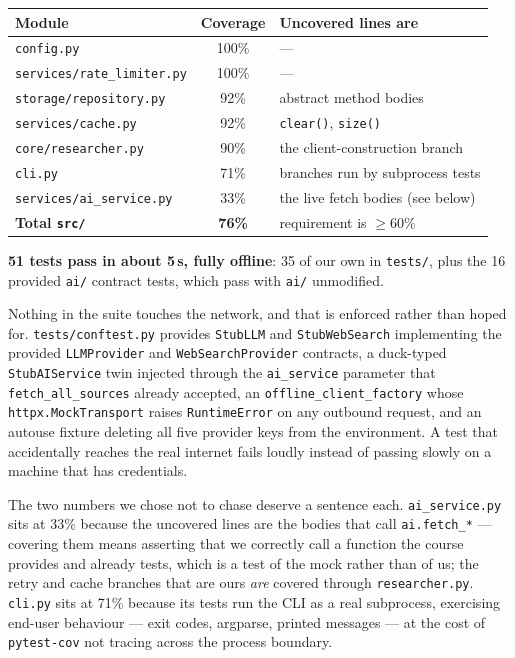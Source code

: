 \documentclass[11pt,a4paper]{article}
\begin{document}
\begin{center}\small
\begin{tabular}{lcl}
\toprule
\textbf{Module} & \textbf{Coverage} & \textbf{Uncovered lines are} \\
\midrule
\texttt{config.py}                & 100\% & --- \\
\texttt{services/rate\_limiter.py} & 100\% & --- \\
\texttt{storage/repository.py}    & 92\%  & abstract method bodies \\
\texttt{services/cache.py}        & 92\%  & \texttt{clear()}, \texttt{size()} \\
\texttt{core/researcher.py}       & 90\%  & the client-construction branch \\
\texttt{cli.py}                   & 71\%  & branches run by subprocess tests \\
\texttt{services/ai\_service.py}  & 33\%  & the live fetch bodies (see below) \\
\midrule
\textbf{Total \texttt{src/}}      & \textbf{76\%} & requirement is $\ge 60\%$ \\
\bottomrule
\end{tabular}
\end{center}

\vspace{-0.3em}
\noindent\textbf{51 tests pass in about 5\,s, fully offline}: 35 of our own in \texttt{tests/}, plus
the 16 provided \texttt{ai/} contract tests, which pass with \texttt{ai/} unmodified.

Nothing in the suite touches the network, and that is enforced rather than hoped for.
\texttt{tests/conftest.py} provides \texttt{StubLLM} and \texttt{StubWebSearch} implementing the
provided \texttt{LLMProvider} and \texttt{WebSearchProvider} contracts, a duck-typed
\texttt{StubAIService} twin injected through the \texttt{ai\_service} parameter that
\texttt{fetch\_all\_sources} already accepted, an \texttt{offline\_client\_factory} whose
\texttt{httpx.MockTransport} raises \texttt{RuntimeError} on any outbound request, and an autouse
fixture deleting all five provider keys from the environment. A test that accidentally reaches
the real internet fails loudly instead of passing slowly on a machine that has credentials.

The two numbers we chose not to chase deserve a sentence each. \texttt{ai\_service.py} sits at
33\% because the uncovered lines are the bodies that call \texttt{ai.fetch\_*} --- covering them
means asserting that we correctly call a function the course provides and already tests, which is
a test of the mock rather than of us; the retry and cache branches that are ours \emph{are}
covered through \texttt{researcher.py}. \texttt{cli.py} sits at 71\% because its tests run the
CLI as a real subprocess, exercising end-user behaviour --- exit codes, argparse, printed
messages --- at the cost of \texttt{pytest-cov} not tracing across the process boundary.
\end{document}

